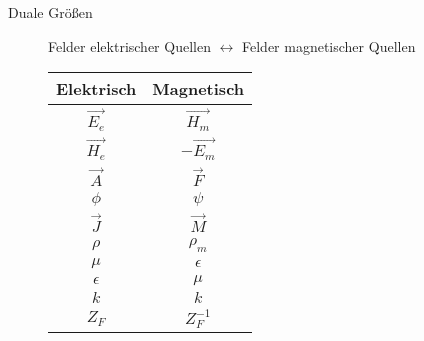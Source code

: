 \begin{description}
\item[Duale Größen] Felder elektrischer Quellen $\leftrightarrow$ Felder magnetischer Quellen
\begin{center}
\begin{tabular}{cc} \toprule
Elektrisch & Magnetisch \\ \midrule
$\vec{E_e}$ & $\vec{H_m}$ \\
$\vec{H_e}$ & $-\vec{E_m}$ \\
$\vec{A}$ & $\vec{F}$\\
$\phi$ & $\psi$ \\
$\vec{J}$ & $\vec{M}$ \\
$\rho$ & $\rho_m$\\
$\mu$ & $\epsilon$\\
$\epsilon$ & $\mu$\\
$k$ & $k$\\
$Z_F$ & $Z_F^{-1}$\\
\bottomrule
\end{tabular}
\end{center}


\end{description}
